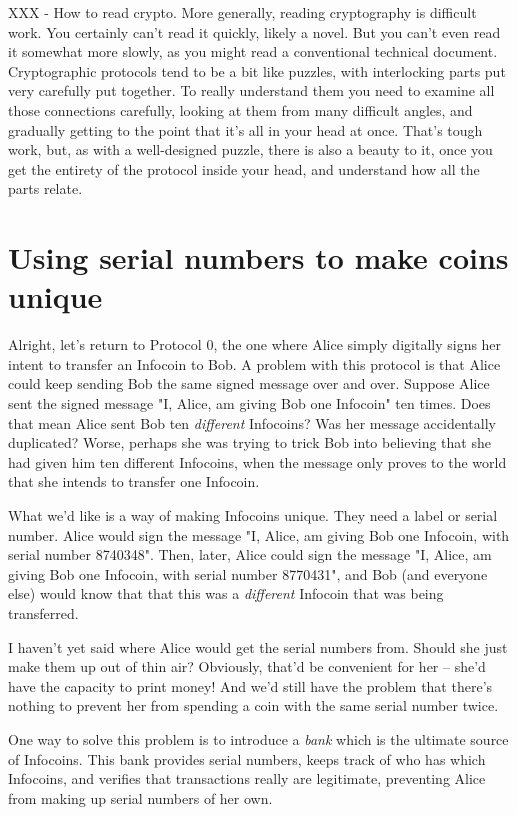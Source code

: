 \documentclass[12pt]{book}
\newcounter{problem}[chapter]
\begin{document}
XXX - How to read crypto.  More generally, reading cryptography is
difficult work.  You certainly can't read it quickly, likely a novel.
But you can't even read it somewhat more slowly, as you might read a
conventional technical document.  Cryptographic protocols tend to be a
bit like puzzles, with interlocking parts put very carefully put
together.  To really understand them you need to examine all those
connections carefully, looking at them from many difficult angles, and
gradually getting to the point that it's all in your head at once.
That's tough work, but, as with a well-designed puzzle, there is also
a beauty to it, once you get the entirety of the protocol inside your
head, and understand how all the parts relate.

\section{Using serial numbers to make coins unique}

Alright, let's return to Protocol 0, the one where Alice simply
digitally signs her intent to transfer an Infocoin to Bob.  A problem
with this protocol is that Alice could keep sending Bob the same
signed message over and over.  Suppose Alice sent the signed message
"I, Alice, am giving Bob one Infocoin" ten times.  Does that mean
Alice sent Bob ten \emph{different} Infocoins?  Was her message
accidentally duplicated?  Worse, perhaps she was trying to trick Bob
into believing that she had given him ten different Infocoins, when
the message only proves to the world that she intends to transfer one
Infocoin.

What we'd like is a way of making Infocoins unique.  They need a label
or serial number.  Alice would sign the message "I, Alice, am giving
Bob one Infocoin, with serial number 8740348".  Then, later, Alice
could sign the message "I, Alice, am giving Bob one Infocoin, with
serial number 8770431", and Bob (and everyone else) would know that
that this was a \emph{different} Infocoin that was being transferred.

I haven't yet said where Alice would get the serial numbers from.
Should she just make them up out of thin air?  Obviously, that'd be
convenient for her -- she'd have the capacity to print money!  And
we'd still have the problem that there's nothing to prevent her from
spending a coin with the same serial number twice.

One way to solve this problem is to introduce a \emph{bank} which is
the ultimate source of Infocoins.  This bank provides serial numbers,
keeps track of who has which Infocoins, and verifies that transactions
really are legitimate, preventing Alice from making up serial numbers
of her own.
\end{document}
